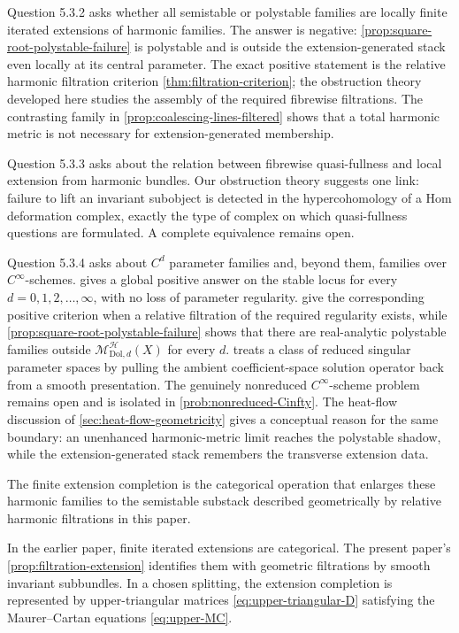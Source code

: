\documentclass[11pt,reqno]{amsart}
\theoremstyle{definition}
\theoremstyle{remark}
\newcommand{\cH}{\mathcal H}
\newcommand{\Dol}{\mathrm{Dol}}
\begin{document}
Question 5.3.2 asks whether all semistable or polystable families are locally finite iterated extensions of harmonic families.  The answer is negative: \cref{prop:square-root-polystable-failure} is polystable and is outside the extension-generated stack even locally at its central parameter.  The exact positive statement is the relative harmonic filtration criterion \cref{thm:filtration-criterion}; the obstruction theory developed here studies the assembly of the required fibrewise filtrations.  The contrasting family in \cref{prop:coalescing-lines-filtered} shows that a total harmonic metric is not necessary for extension-generated membership.

Question 5.3.3 asks about the relation between fibrewise quasi-fullness and local extension from harmonic bundles.  Our obstruction theory suggests one link: failure to lift an invariant subobject is detected in the hypercohomology of a Hom deformation complex, exactly the type of complex on which quasi-fullness questions are formulated.  A complete equivalence remains open.

Question 5.3.4 asks about $C^d$ parameter families and, beyond them, families over $C^\infty$-schemes.   gives a global positive answer on the stable locus for every $d=0,1,2,\ldots,\infty$, with no loss of parameter regularity.   give the corresponding positive criterion when a relative filtration of the required regularity exists, while \cref{prop:square-root-polystable-failure} shows that there are real-analytic polystable families outside $\mathscr M_{\Dol,d}^{\cH}(X)$ for every $d$.   treats a class of reduced singular parameter spaces by pulling the ambient coefficient-space solution operator back from a smooth presentation.  The genuinely nonreduced $C^\infty$-scheme problem remains open and is isolated in \cref{prob:nonreduced-Cinfty}.  The heat-flow discussion of \cref{sec:heat-flow-geometricity} gives a conceptual reason for the same boundary: an unenhanced harmonic-metric limit reaches the polystable shadow, while the extension-generated stack remembers the transverse extension data.


The finite extension completion is the categorical operation that enlarges these harmonic families to the semistable substack described geometrically by relative harmonic filtrations in this paper.


In the earlier paper, finite iterated extensions are categorical.  The present paper's \cref{prop:filtration-extension} identifies them with geometric filtrations by smooth invariant subbundles.  In a chosen splitting, the extension completion is represented by upper-triangular matrices \eqref{eq:upper-triangular-D} satisfying the Maurer--Cartan equations \eqref{eq:upper-MC}.
\end{document}
